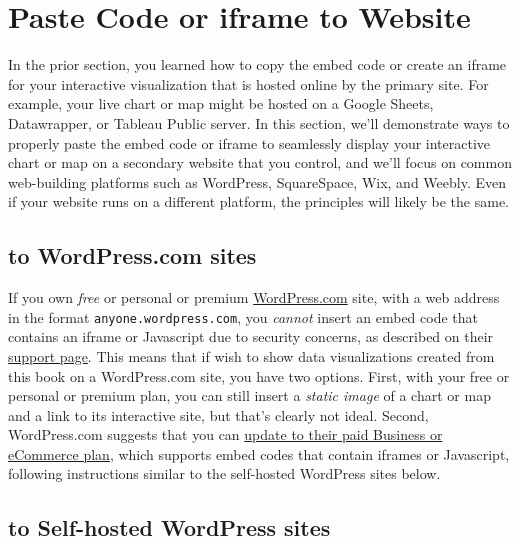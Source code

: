 \documentclass[
  english,
]{book}
\begin{document}
\hypertarget{paste-code}{%
\section*{Paste Code or iframe to Website}\label{paste-code}}

In the prior section, you learned how to copy the embed code or create an iframe for your interactive visualization that is hosted online by the primary site. For example, your live chart or map might be hosted on a Google Sheets, Datawrapper, or Tableau Public server. In this section, we'll demonstrate ways to properly paste the embed code or iframe to seamlessly display your interactive chart or map on a secondary website that you control, and we'll focus on common web-building platforms such as WordPress, SquareSpace, Wix, and Weebly. Even if your website runs on a different platform, the principles will likely be the same.

\hypertarget{to-wordpress.com-sites}{%
\subsection*{to WordPress.com sites}\label{to-wordpress.com-sites}}

If you own \emph{free} or personal or premium \href{https://wordpress.com}{WordPress.com} site, with a web address in the format \texttt{anyone.wordpress.com}, you \emph{cannot} insert an embed code that contains an iframe or Javascript due to security concerns, as described on their \href{https://wordpress.com/support/troubleshooting-embed-links-and-shortcodes/}{support page}. This means that if wish to show data visualizations created from this book on a WordPress.com site, you have two options. First, with your free or personal or premium plan, you can still insert a \emph{static image} of a chart or map and a link to its interactive site, but that's clearly not ideal. Second, WordPress.com suggests that you can \href{https://wordpress.com/support/plan-features/}{update to their paid Business or eCommerce plan}, which supports embed codes that contain iframes or Javascript, following instructions similar to the self-hosted WordPress sites below.

\hypertarget{to-self-hosted-wordpress-sites}{%
\subsection*{to Self-hosted WordPress sites}\label{to-self-hosted-wordpress-sites}}
\end{document}
